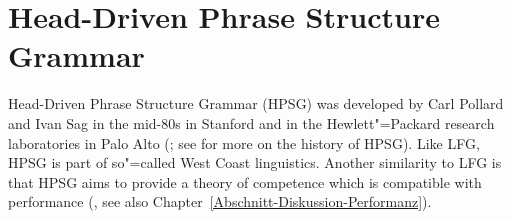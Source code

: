 
\chapter{Head-Driven Phrase Structure Grammar}
\label{Kapitel-HPSG}
\label{chap-HPSG}\label{chap-hpsg}

Head-Driven Phrase Structure Grammar (HPSG) was
developed by Carl Pollard and Ivan Sag in the mid-80s in Stanford and in the Hewlett"=Packard
research laboratories in Palo Alto (\citealp{ps,ps2}; see \citealp{FWPEvolution} for more on the
history of HPSG). Like LFG, HPSG is part of so"=called West Coast linguistics. Another similarity to
LFG is that HPSG aims to provide a theory of competence which is compatible with performance
(\citealp{SW2011a,SW2015a,Wasow2021a}, see also Chapter~\ref{Abschnitt-Diskussion-Performanz}).

